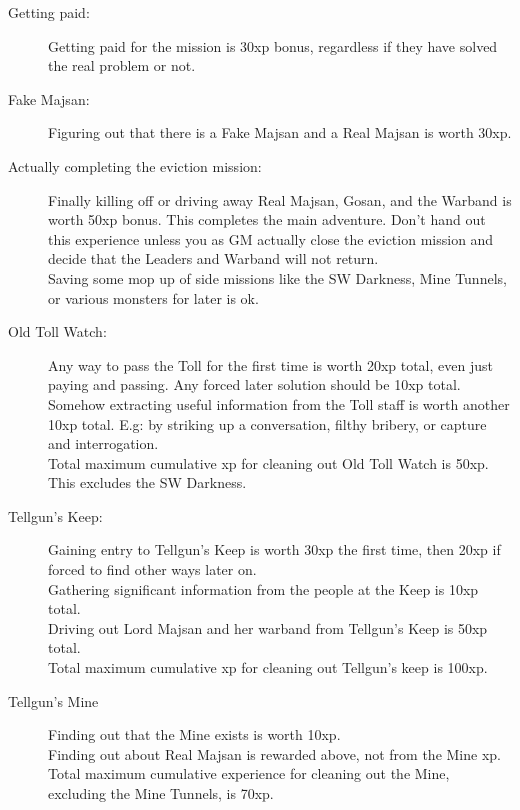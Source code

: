 \begin{description}

\item[Getting paid:] Getting paid for the mission is 30xp bonus, regardless if they have solved the real problem or not.

\item[Fake Majsan:] Figuring out that there is a Fake Majsan and a Real Majsan is worth 30xp.

\item[Actually completing the eviction mission:] Finally killing off or driving away Real Majsan, Gosan, and the Warband is worth 50xp bonus. This completes the main adventure. Don't hand out this experience unless you as GM actually close the eviction mission and decide that the Leaders and Warband will not return.\\
Saving some mop up of side missions like the SW Darkness, Mine Tunnels, or various monsters for later is ok.

\item[Old Toll Watch:] Any way to pass the Toll for the first time is worth 20xp total, even just paying and passing. Any forced later solution should be 10xp total.
Somehow extracting useful information from the Toll staff is worth another 10xp total. E.g: by striking up a conversation, filthy bribery, or capture and interrogation.\\
Total maximum cumulative xp for cleaning out Old Toll Watch is 50xp. This excludes the SW Darkness.

\item[Tellgun's Keep:] Gaining entry to Tellgun's Keep is worth 30xp the first time, then 20xp if forced to find other ways later on.\\
Gathering significant information from the people at the Keep is 10xp total.\\
Driving out Lord Majsan and her warband from Tellgun's Keep is 50xp total.\\
Total maximum cumulative xp for cleaning out Tellgun's keep is 100xp.

\item[Tellgun's Mine]
Finding out that the Mine exists is worth 10xp.\\
Finding out about Real Majsan is rewarded above, not from the Mine xp.\\
Total maximum cumulative experience for cleaning out the Mine, excluding the Mine Tunnels, is 70xp.


\end{description}
